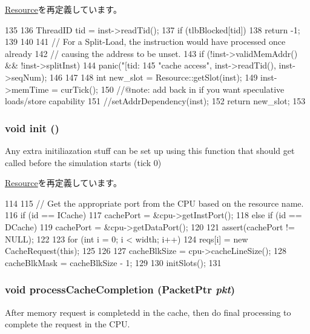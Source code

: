 \hyperlink{classResource_ab3ba2ee95c723c8c056db0a1f2a6dfd3}{Resource}を再定義しています。


\begin{DoxyCode}
135 {
136     ThreadID tid = inst->readTid();
137     if (tlbBlocked[tid]) {
138         return -1;
139     }
140 
141     // For a Split-Load, the instruction would have processed once already
142     // causing the address to be unset.
143     if (!inst->validMemAddr() && !inst->splitInst) {
144         panic("[tid:%
145               "cache access\n", inst->readTid(), inst->seqNum);
146     }
147 
148     int new_slot = Resource::getSlot(inst);
149     inst->memTime = curTick();
150     //@note: add back in if you want speculative loads/store capability
151     //setAddrDependency(inst);
152     return new_slot;
153 }
\end{DoxyCode}
\hypertarget{classCacheUnit_a02fd73d861ef2e4aabb38c0c9ff82947}{
\subsubsection[{init}]{\setlength{\rightskip}{0pt plus 5cm}void init ()}}
\label{classCacheUnit_a02fd73d861ef2e4aabb38c0c9ff82947}
Any extra initiliazation stuff can be set up using this function that should get called before the simulation starts (tick 0) 

\hyperlink{classResource_a02fd73d861ef2e4aabb38c0c9ff82947}{Resource}を再定義しています。


\begin{DoxyCode}
114 {
115     // Get the appropriate port from the CPU based on the resource name.
116     if (id == ICache) {
117         cachePort = &cpu->getInstPort();
118     } else if (id == DCache) {
119         cachePort = &cpu->getDataPort();
120     }
121     assert(cachePort != NULL);
122 
123     for (int i = 0; i < width; i++) {
124         reqs[i] = new CacheRequest(this);
125     }
126 
127     cacheBlkSize = cpu->cacheLineSize();
128     cacheBlkMask = cacheBlkSize  - 1;
129 
130     initSlots();
131 }
\end{DoxyCode}
\hypertarget{classCacheUnit_a3dc029c2e87eb911352b82ff15c86236}{
\subsubsection[{processCacheCompletion}]{\setlength{\rightskip}{0pt plus 5cm}void processCacheCompletion ({\bf PacketPtr} {\em pkt})}}
\label{classCacheUnit_a3dc029c2e87eb911352b82ff15c86236}
After memory request is completedd in the cache, then do final processing to complete the request in the CPU. 

